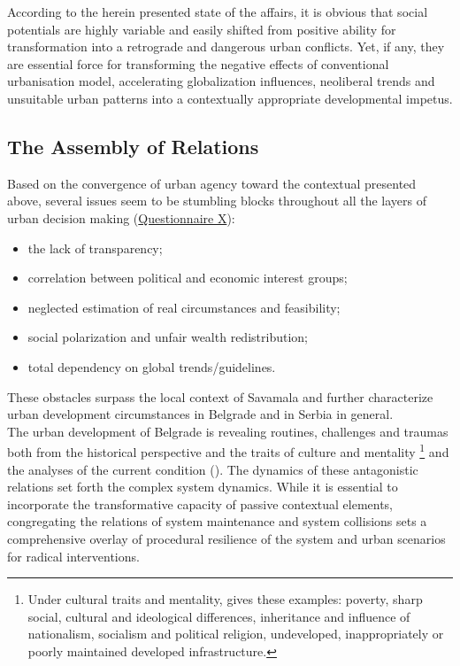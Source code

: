 \documentclass[11pt]{report}
\begin{document}
According to the herein presented state of the affairs, it is obvious that social potentials are highly variable and easily shifted from positive ability for transformation into a retrograde and dangerous urban conflicts. 
Yet, if any, they are essential force for transforming the negative effects of conventional urbanisation model, accelerating globalization influences, neoliberal trends and unsuitable urban patterns into a contextually appropriate developmental impetus. 

\subsection{The Assembly of Relations}

Based on the convergence of urban agency toward  the contextual presented above, several issues seem to be stumbling blocks throughout all the layers of urban decision making
(\href{Questionnaire Experts Post-socialist}{Questionnaire X}):

\begin{itemize}
\item the lack of transparency;
\item correlation between political and economic interest groups;
\item neglected estimation of real circumstances and feasibility;
\item social polarization and unfair wealth redistribution;
\item total dependency on global trends/guidelines.
\end{itemize}

These obstacles surpass the local context of Savamala and further characterize urban development circumstances in Belgrade and in Serbia in general.
\\

The  urban  development  of  Belgrade  is  revealing  routines, challenges  and  traumas both from the historical perspective and the traits of culture and mentality
\footnote{Under cultural traits and mentality, \href{Samardzic}{\cite{doytchinov_belgrade_2015}} gives these examples: poverty, sharp social, cultural and ideological differences, inheritance and influence of nationalism, socialism and political religion, undeveloped, inappropriately or poorly maintained developed infrastructure.}
and the analyses of the current condition (\citealt{doytchinov_belgrade_2015}). 
The dynamics of these antagonistic relations set forth the complex system dynamics.
While it is essential to incorporate the transformative capacity of passive contextual elements, congregating the relations of system maintenance and system collisions sets a comprehensive overlay of procedural resilience of the system and urban scenarios for radical interventions.
\\
\end{document}
